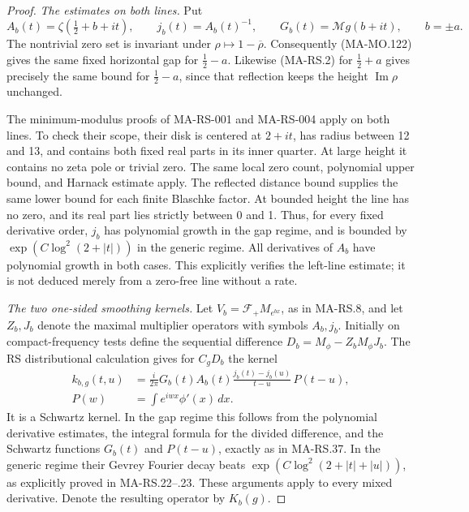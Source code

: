 \begin{proof}
\emph{The estimates on both lines.}
Put
\[
 A_b(t)=\zeta(\tfrac12+b+it),\qquad j_b(t)=A_b(t)^{-1},
 \qquad G_b(t)=\mathcal Mg(b+it),\qquad b=\pm a.
 \tag{MA-MO.124}
\]
The nontrivial zero set is invariant under
\(\rho\mapsto1-\overline\rho\). Consequently (MA-MO.122)
gives the same fixed horizontal gap for \(\tfrac12-a\).
Likewise (MA-RS.2) for \(\tfrac12+a\) gives precisely the
same bound for \(\tfrac12-a\), since that reflection keeps
the height \(\operatorname{Im}\rho\) unchanged.

The minimum-modulus proofs of MA-RS-001 and MA-RS-004 apply
on both lines. To check their scope, their disk is centered
at \(2+it\), has radius between 12 and 13, and contains both
fixed real parts in its inner quarter. At large height it
contains no zeta pole or trivial zero. The same local zero
count, polynomial upper bound, and Harnack estimate apply.
The reflected distance bound supplies the same lower bound
for each finite Blaschke factor. At bounded height the line
has no zero, and its real part lies strictly between 0 and 1.
Thus, for every fixed derivative order, \(j_b\) has
polynomial growth in the gap regime, and is bounded by
\(\exp(C\log^2(2+|t|))\) in the generic regime. All
derivatives of \(A_b\) have polynomial growth in both cases.
This explicitly verifies the left-line estimate; it is not
deduced merely from a zero-free line without a rate.

\emph{The two one-sided smoothing kernels.}
Let \(V_b=\mathcal F_+M_{e^{bx}}\), as in MA-RS.8, and
let \(Z_b,J_b\) denote the maximal multiplier operators
with symbols \(A_b,j_b\). Initially on compact-frequency
tests define the sequential difference
\(D_b=M_\phi-Z_bM_\phi J_b\). The RS distributional
calculation gives for \(C_gD_b\) the kernel
\[
 \begin{aligned}
 k_{b,g}(t,u)
    &=\frac{i}{2\pi}G_b(t)A_b(t)
             \frac{j_b(t)-j_b(u)}{t-u}\,P(t-u),\\
 P(w)&=\int e^{iwx}\phi'(x)\,dx.
 \end{aligned}
 \tag{MA-MO.125}
\]
It is a Schwartz kernel. In the gap regime this follows
from the polynomial derivative estimates, the integral
formula for the divided difference, and the Schwartz
functions \(G_b(t)\) and \(P(t-u)\), exactly as in
MA-RS.37. In the generic regime their Gevrey Fourier decay
beats \(\exp(C\log^2(2+|t|+|u|))\), as explicitly proved
in MA-RS.22--.23. These arguments apply to every mixed
derivative. Denote the resulting operator by \(K_b(g)\).


\end{proof}
